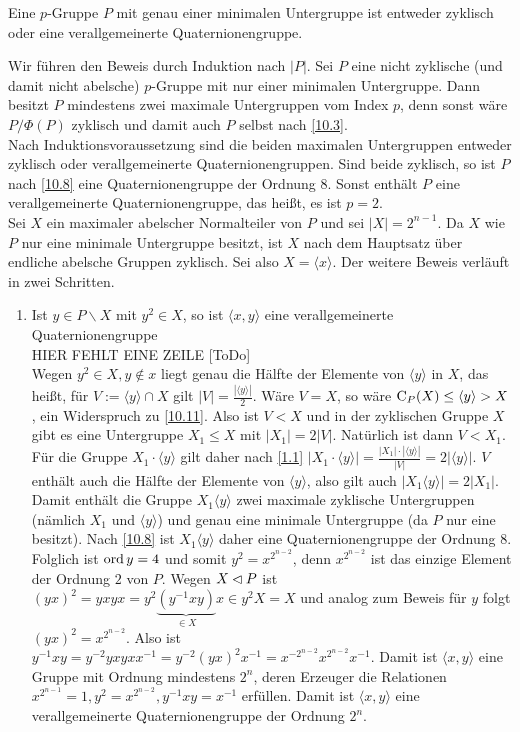\begin{satz}\label{10.12}
 Eine $p$-Gruppe $P$ mit genau einer minimalen Untergruppe ist entweder zyklisch oder eine verallgemeinerte Quaternionengruppe.
\end{satz}
\begin{beweis}
Wir f\"uhren den Beweis durch Induktion nach $|P|$. Sei $P$ eine nicht zyklische (und damit nicht abelsche) $p$-Gruppe mit nur einer minimalen Untergruppe. Dann besitzt $P$ mindestens zwei maximale Untergruppen vom Index $p$, denn sonst w\"are $P/\Phi(P)$ zyklisch und damit  auch $P$ selbst nach \ref{10.3}.\\
Nach Induktionsvoraussetzung sind die beiden maximalen Untergruppen entweder zyklisch oder verallgemeinerte Quaternionengruppen. Sind beide zyklisch, so ist $P$ nach \ref{10.8} eine Quaternionengruppe der Ordnung $8$. Sonst enth\"alt $P$ eine verallgemeinerte Quaternionengruppe, das hei\ss{}t, es ist $p=2$.\\
Sei $X$ ein maximaler abelscher Normalteiler von $P$ und sei $|X|=2^{n-1}$. Da $X$ wie $P$ nur eine minimale Untergruppe besitzt, ist $X$ nach dem Hauptsatz \"uber endliche abelsche Gruppen zyklisch. Sei also $X=\langle x\rangle$. Der weitere Beweis verl\"auft in zwei Schritten.
\begin{enumerate}
 \item \label{10.12.1}Ist $y\in P\backslash X$ mit $y^2\in X$, so ist $\langle x,y\rangle$ eine verallgemeinerte Quaternionengruppe\\
HIER FEHLT EINE ZEILE [ToDo]\\
Wegen $y^2\in X, y \not\in x$ liegt genau die H\"alfte der Elemente von $\langle y\rangle$ in $X$, das hei\ss{}t, f\"ur $V:=\langle y\rangle \cap X$ gilt $|V|=\frac{|\langle y\rangle|}{2}$. W\"are $V=X$, so w\"are $\operatorname{C}_P(X)\leq \langle y \rangle >X$, ein Widerspruch zu \ref{10.11}. Also ist $V<X$ und in der zyklischen Gruppe $X$ gibt es eine Untergruppe $X_1\leq X$ mit $|X_1|=2|V|$. Nat\"urlich ist dann $V<X_1$. F\"ur die Gruppe $X_1\cdot\langle y\rangle$ gilt daher nach \ref{1.1} $|X_1\cdot\langle y\rangle|=\frac{|X_1|\cdot|\langle y\rangle|}{|V|}=2|\langle y\rangle|$. $V$ enth\"alt auch die H\"alfte der Elemente von $\langle y \rangle$, also gilt auch $|X_1\langle y\rangle|=2|X_1|$. Damit enth\"alt die Gruppe $X_1\langle y\rangle$ zwei maximale zyklische Untergruppen (n\"amlich $X_1$ und $\langle y \rangle$) und genau eine minimale Untergruppe (da $P$ nur eine besitzt). Nach \ref{10.8} ist $X_1\langle y\rangle$ daher eine Quaternionengruppe der Ordnung $8$. Folglich ist $\operatorname{ord} y =4$ und somit $y^2=x^{2^{n-2}}$, denn $x^{2^{n-2}}$ ist das einzige Element der Ordnung $2$ von $P$. Wegen $X\lhd P$ ist $(yx)^2=yxyx=y^2\underbrace{(y^{-1}xy)}_{\in X}x\in y^2X=X$ und analog zum Beweis f\"ur $y$ folgt $(yx)^2=x^{2^{n-2}}$. Also ist $y^{-1}xy=y^{-2}yxyxx^{-1}=y^{-2}(yx)^2x^{-1}=x^{-2^{n-2}}x^{2^{n-2}}x^{-1}$. Damit ist $\langle x,y\rangle$ eine Gruppe mit Ordnung mindestens $2^n$, deren Erzeuger die Relationen $x^{2^{n-1}}=1, y^2=x^{2^{n-2}}, y^{-1}xy=x^{-1}$ erf\"ullen. Damit ist $\langle x, y\rangle$ eine verallgemeinerte Quaternionengruppe der Ordnung $2^n$.

\end{enumerate}
\end{beweis}

